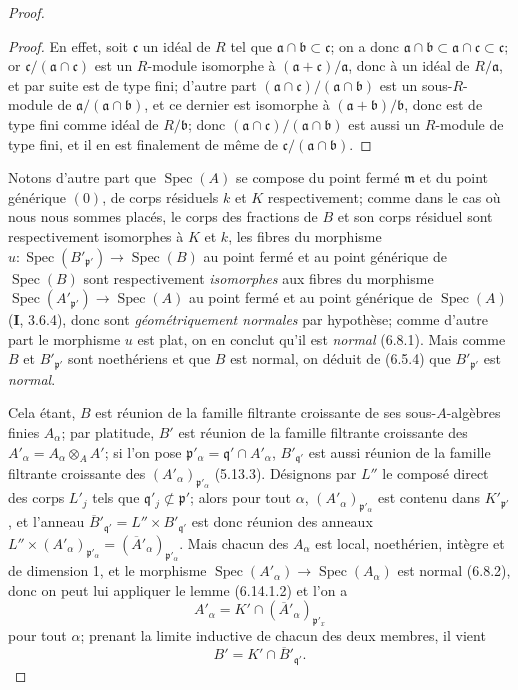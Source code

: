 \begin{proof}
\begin{proof}
En effet, soit $\mathfrak c$ un idéal de $R$ tel que
$\mathfrak a\cap\mathfrak b\subset\mathfrak c$; on a donc
$\mathfrak a\cap\mathfrak b\subset\mathfrak a\cap\mathfrak c\subset
\mathfrak c$; or $\mathfrak c/(\mathfrak a\cap\mathfrak c)$ est un
$R$-module isomorphe à $(\mathfrak a+\mathfrak c)/\mathfrak a$, donc à un
idéal de $R/\mathfrak a$, et par suite est de type fini; d'autre part
$(\mathfrak a\cap\mathfrak c)/(\mathfrak a\cap\mathfrak b)$ est un
sous-$R$-module de $\mathfrak a/(\mathfrak a\cap\mathfrak b)$, et ce
dernier est isomorphe à $(\mathfrak a+\mathfrak b)/\mathfrak b$, donc est
de type fini comme idéal de $R/\mathfrak b$; donc
$(\mathfrak a\cap\mathfrak c)/(\mathfrak a\cap\mathfrak b)$ est aussi un
$R$-module de type fini, et il en est finalement de même de
$\mathfrak c/(\mathfrak a\cap\mathfrak b)$.
\end{proof}

Notons d'autre part que $\operatorname{Spec}(A)$ se compose du point fermé
$\mathfrak m$ et du point générique $(0)$, de corps résiduels $k$ et $K$
respectivement; comme dans le cas où nous nous sommes placés, le corps des
fractions de $B$ et son corps résiduel sont respectivement isomorphes à $K$
et $k$, les fibres du morphisme
$u:\operatorname{Spec}(B'_{\mathfrak p'})\to\operatorname{Spec}(B)$ au
point fermé et au point générique de $\operatorname{Spec}(B)$ sont
respectivement \emph{isomorphes} aux fibres du morphisme
$\operatorname{Spec}(A'_{\mathfrak p'})\to\operatorname{Spec}(A)$ au point
fermé et au point générique de $\operatorname{Spec}(A)$ (\textbf{I}, 3.6.4), donc
sont \emph{géométriquement normales} par hypothèse; comme d'autre part le
morphisme $u$ est plat, on en conclut qu'il est \emph{normal} (6.8.1). Mais comme
$B$ et $B'_{\mathfrak p'}$ sont noethériens et que $B$ est normal, on
déduit de (6.5.4) que $B'_{\mathfrak p'}$ est \emph{normal}.

Cela étant, $B$ est réunion de la famille filtrante croissante de ses
sous-$A$-algèbres finies $A_\alpha$; par platitude, $B'$ est réunion de la
famille filtrante croissante des
$A'_\alpha=A_\alpha\otimes_A A'$; si l'on pose
$\mathfrak p'_\alpha=\mathfrak q'\cap A'_\alpha$,
$B'_{\mathfrak q'}$ est aussi réunion de la famille filtrante croissante
des $(A'_\alpha)_{\mathfrak p'_\alpha}$ (5.13.3). Désignons par $L''$ le
composé direct des corps $L'_j$ tels que
$\mathfrak q'_j\not\subset\mathfrak p'$; alors pour tout $\alpha$,
$(A'_\alpha)_{\mathfrak p'_\alpha}$ est contenu dans
$K'_{\mathfrak p'}$, et l'anneau
$\overline{B}'_{\mathfrak q'}=L''\times B'_{\mathfrak q'}$ est donc réunion
des anneaux
$L''\times(A'_\alpha)_{\mathfrak p'_\alpha}=
(\overline{A}'_\alpha)_{\mathfrak p'_\alpha}$. Mais chacun des $A_\alpha$
est local, noethérien, intègre et de dimension 1, et le morphisme
$\operatorname{Spec}(A'_\alpha)\to\operatorname{Spec}(A_\alpha)$ est
normal (6.8.2), donc on peut lui appliquer le lemme (6.14.1.2) et l'on a
\[
A'_\alpha=K'\cap(\overline{A}'_\alpha)_{\mathfrak p'_x}
\]
pour tout $\alpha$; prenant la limite inductive de chacun des deux membres,
il vient
\[
B'=K'\cap\overline{B}'_{\mathfrak q'}.
\]


\end{proof}
